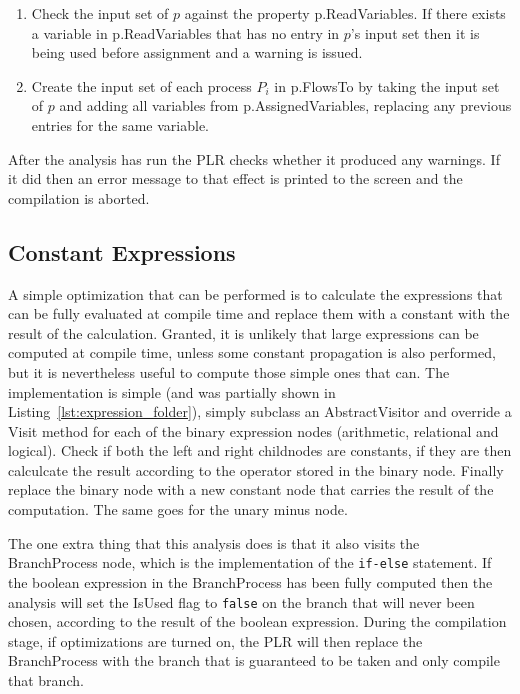   	\begin{enumerate}
  		\item Check the input set of $p$ against the property 
  		\textsf{p.ReadVariables}. If there exists a variable in 
  		\textsf{p.ReadVariables} that has no entry in $p$'s input set then it is 
  		being used before assignment and a warning is issued.
  		
  		\item Create the input set of each process $P_i$ in \textsf{p.FlowsTo} 
  		by taking the input set of $p$ and adding all variables from 
  		\textsf{p.AssignedVariables}, replacing any previous entries for the 
  		same variable.
  	
  	\end{enumerate}
  	
  After the analysis has run the PLR checks whether it produced any warnings. 
  If it did then an error message to that effect is printed to the screen and 
  the compilation is aborted.
	

\subsection{Constant Expressions}

	A simple optimization that can be performed is to calculate the expressions 
	that can be fully evaluated at compile time and replace them with a constant 
	with the result of the calculation. Granted, it is unlikely that large 
	expressions can be computed at compile time, unless some constant 
	propagation is also performed, but it is nevertheless useful to compute 
	those simple ones that can. The implementation is simple (and was partially 
	shown in Listing~\ref{lst:expression_folder}), simply subclass an 
	\textsf{AbstractVisitor} and override a \textsf{Visit} method for each of 
	the binary expression nodes (arithmetic, relational and logical). Check if 
	both the left and right childnodes are constants, if they are then 
	calculcate the result according to the operator stored in the binary node. 
	Finally replace the binary node with a new constant node that carries the 
	result of the computation. The same goes for the unary minus node.
	
	The one extra thing that this analysis does is that it also visits the
	\textsf{BranchProcess} node, which is the implementation of the
	\texttt{if-else} statement. If the boolean expression in the 
	\textsf{BranchProcess} has been fully computed then the analysis will set 
	the \textsf{IsUsed} flag to \texttt{false} on the branch that will never 
	been chosen, according to the result of the boolean expression. During the 
	compilation stage, if optimizations are turned on, the PLR will then replace 
	the \textsf{BranchProcess} with the branch that is guaranteed to be taken 
	and only compile that branch.

